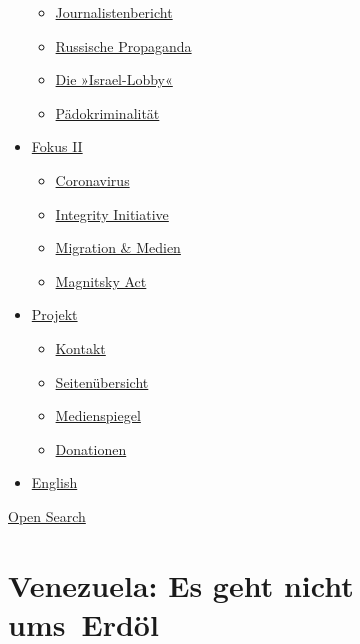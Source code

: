 \begin{itemize}
  \begin{itemize}
  \tightlist
  \item
    \href{https://swprs.org/bericht-eines-journalisten/}{Journalistenbericht}
  \item
    \href{https://swprs.org/russische-propaganda/}{Russische Propaganda}
  \item
    \href{https://swprs.org/die-israel-lobby-fakten-und-mythen/}{Die
    »Israel-Lobby«}
  \item
    \href{https://swprs.org/geopolitik-und-paedokriminalitaet/}{Pädokriminalität}
  \end{itemize}
\item
  \href{https://swprs.org/migration-und-medien/}{Fokus II}

  \begin{itemize}
  \tightlist
  \item
    \href{https://swprs.org/covid-19-hinweis-ii/}{Coronavirus}
  \item
    \href{https://swprs.org/die-integrity-initiative/}{Integrity
    Initiative}
  \item
    \href{https://swprs.org/migration-und-medien/}{Migration \& Medien}
  \item
    \href{https://swprs.org/der-fall-magnitsky/}{Magnitsky Act}
  \end{itemize}
\item
  \href{https://swprs.org/kontakt/}{Projekt}

  \begin{itemize}
  \tightlist
  \item
    \href{https://swprs.org/kontakt/}{Kontakt}
  \item
    \href{https://swprs.org/uebersicht/}{Seitenübersicht}
  \item
    \href{https://swprs.org/medienspiegel/}{Medienspiegel}
  \item
    \href{https://swprs.org/donationen/}{Donationen}
  \end{itemize}
\item
  \href{https://swprs.org/contact/}{English}
\end{itemize}

\protect\hyperlink{}{Open Search}

\hypertarget{venezuela-es-geht-nicht-ums-erduxf6l}{%
\section{Venezuela: Es geht nicht
ums~Erdöl}\label{venezuela-es-geht-nicht-ums-erduxf6l}}

